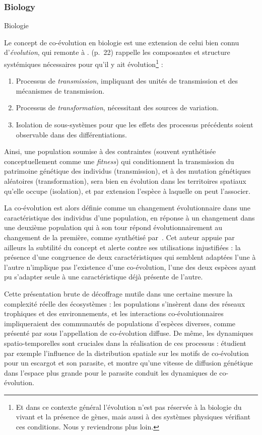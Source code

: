 \subsubsection{Biology}{Biologie}

Le concept de co-évolution en biologie est une extension de celui bien connu d'\emph{évolution}, qui remonte à . \cite{durham1991coevolution} (p.~22) rappelle les composantes et structure systémiques nécessaires pour qu'il y ait évolution\footnote{Et dans ce contexte général l'évolution n'est pas réservée à la biologie du vivant et la présence de gènes, mais aussi à des systèmes physiques vérifiant ces conditions. Nous y reviendrons plus loin.} :

\begin{enumerate}
	\item Processus de \emph{transmission}, impliquant des unités de transmission et des mécanismes de transmission.
	\item Processus de \emph{transformation}, nécessitant des sources de variation.
	\item Isolation de sous-systèmes pour que les effets des processus précédents soient observable dans des différentiations.
\end{enumerate}

Ainsi, une population soumise à des contraintes (souvent synthétisée conceptuellement comme une \emph{fitness}) qui conditionnent la transmission du patrimoine génétique des individus (transmission), et à des mutation génétiques aléatoires (transformation), sera bien en évolution dans les territoires spatiaux qu'elle occupe (isolation), et par extension l'espèce à laquelle on peut l'associer.


La co-évolution est alors définie comme un changement évolutionnaire dans une caractéristique des individus d'une population, en réponse à un changement dans une deuxième population qui à son tour répond évolutionnairement au changement de la première, comme synthétisé par~\cite{janzen1980coevolution}. Cet auteur appuie par ailleurs la subtilité du concept et alerte contre ses utilisations injustifiées : la présence d'une congruence de deux caractéristiques qui semblent adaptées l'une à l'autre n'implique pas l'existence d'une co-évolution, l'une des deux espèces ayant pu s'adapter seule à une caractéristique déjà présente de l'autre.

Cette présentation brute de décoffrage mutile dans une certaine mesure la complexité réelle des écosystèmes : les populations s'insèrent dans des réseaux trophiques et des environnements, et les interactions co-évolutionnaires impliqueraient des communautés de populations d'espèces diverses, comme présenté par \cite{strauss2005toward} sous l'appellation de co-évolution diffuse. De même, les dynamiques spatio-temporelles sont cruciales dans la réalisation de ces processus : \cite{dybdahl1996geography} étudient par exemple l'influence de la distribution spatiale sur les motifs de co-évolution pour un escargot et son parasite, et montre qu'une vitesse de diffusion génétique dans l'espace plus grande pour le parasite conduit les dynamiques de co-évolution.

